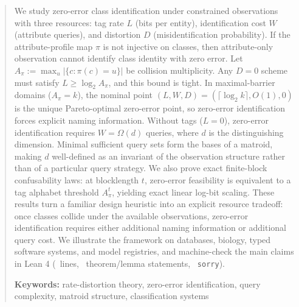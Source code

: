 \begin{abstract}
We study zero-error class identification under constrained observations with three resources: tag rate $L$ (bits per entity), identification cost $W$ (attribute queries), and distortion $D$ (misidentification probability). If the attribute-profile map $\pi$ is not injective on classes, then attribute-only observation cannot identify class identity with zero error. Let $A_\pi := \max_u |\{c : \pi(c)=u\}|$ be collision multiplicity. Any $D=0$ scheme must satisfy $L \ge \log_2 A_\pi$, and this bound is tight. In maximal-barrier domains ($A_\pi=k$), the nominal point $(L,W,D)=(\lceil\log_2 k\rceil,O(1),0)$ is the unique Pareto-optimal zero-error point, so zero-error identification forces explicit naming information. Without tags ($L=0$), zero-error identification requires $W=\Omega(d)$ queries, where $d$ is the distinguishing dimension. Minimal sufficient query sets form the bases of a matroid, making $d$ well-defined as an invariant of the observation structure rather than of a particular query strategy. We also prove exact finite-block confusability laws: at blocklength $t$, zero-error feasibility is equivalent to a tag alphabet threshold $A_\pi^t$, yielding exact linear log-bit scaling. These results turn a familiar design heuristic into an explicit resource tradeoff: once classes collide under the available observations, zero-error identification requires either additional naming information or additional query cost. We illustrate the framework on databases, biology, typed software systems, and model registries, and machine-check the main claims in Lean 4 (\LeanTotalLines\ lines, \LeanTotalTheorems\ theorem/lemma statements, \LeanTotalSorry\ \texttt{sorry}).

\textbf{Keywords:} rate-distortion theory, zero-error identification, query complexity, matroid structure, classification systems
\end{abstract}
